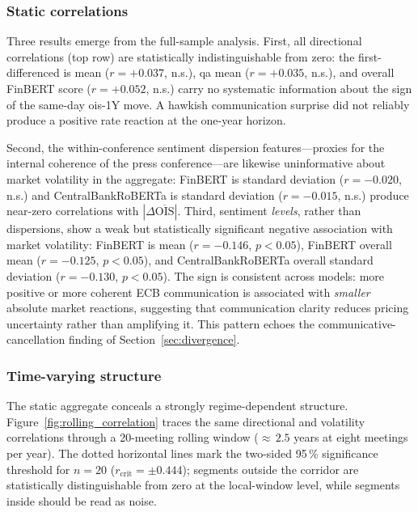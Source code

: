 \subsubsection*{Static correlations}

Three results emerge from the full-sample analysis. First, all directional correlations (top row) are statistically indistinguishable from zero: the first-differenced \gls{is} mean ($r = +0.037$, n.s.), \gls{qa} mean ($r = +0.035$, n.s.), and overall FinBERT score ($r = +0.052$, n.s.) carry no systematic information about the sign of the same-day \gls{ois}-1Y move. A hawkish communication surprise did not reliably produce a positive rate reaction at the one-year horizon.

Second, the within-conference sentiment dispersion features---proxies for the internal coherence of the press conference---are likewise uninformative about market volatility in the aggregate: FinBERT \gls{is} standard deviation ($r = -0.020$, n.s.) and CentralBankRoBERTa \gls{is} standard deviation ($r = -0.015$, n.s.) produce near-zero correlations with $|\Delta\overline{\text{OIS}}|$. Third, sentiment \emph{levels}, rather than dispersions, show a weak but statistically significant negative association with market volatility: FinBERT \gls{is} mean ($r = -0.146$, $p < 0.05$), FinBERT overall mean ($r = -0.125$, $p < 0.05$), and CentralBankRoBERTa overall standard deviation ($r = -0.130$, $p < 0.05$). The sign is consistent across models: more positive or more coherent ECB communication is associated with \emph{smaller} absolute market reactions, suggesting that communication clarity reduces pricing uncertainty rather than amplifying it. This pattern echoes the communicative-cancellation finding of Section~\ref{sec:divergence}.

\subsubsection*{Time-varying structure}
\label{sec:rolling}
The static aggregate conceals a strongly regime-dependent structure. Figure~\ref{fig:rolling_correlation} traces the same directional and volatility correlations through a 20-meeting rolling window (${\approx}\,2.5$ years at eight meetings per year). The dotted horizontal lines mark the two-sided 95\,\% significance threshold for $n = 20$ ($r_{\text{crit}} = \pm 0.444$); segments outside the corridor are statistically distinguishable from zero at the local-window level, while segments inside should be read as noise.

